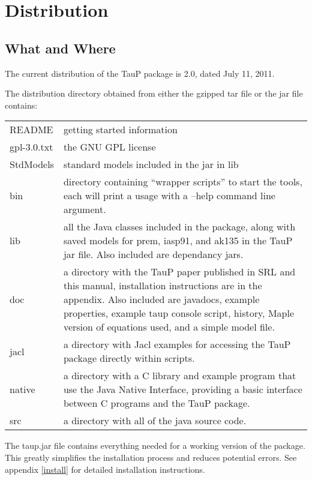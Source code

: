 
\section{Distribution}


\subsection{What and Where}
The current distribution of the TauP package is 2.0, dated July 11, 2011.

The distribution directory obtained from either the gzipped tar file or the jar file contains:

\begin{center}
\begin{tabular}{lp{4in}}
README & getting started information \\
gpl-3.0.txt & the GNU GPL license \\
StdModels & standard models included in the jar in lib \\
bin & directory containing ``wrapper scripts'' to start the tools,
   each will print a usage with a --help command line argument. \\
lib & all the Java classes included in the package, along with
               saved models for prem, iasp91, and ak135 in the TauP jar file. 
               Also included are dependancy jars. \\
doc & a directory with the TauP paper published in SRL and this manual,  
installation instructions are in the appendix. Also included are javadocs,
example properties, example taup console script, history, Maple version of equations used, and a simple model file.\\
jacl & a directory with Jacl examples for accessing the TauP package directly within scripts. \\
native & a directory with a C library and example program that use the
Java Native Interface, providing a basic interface between C programs
and the TauP package. \\
src & a directory with all of the java source code. \\
\end{tabular}
\end{center}

The taup.jar file contains everything needed for a working version of the package.
This greatly simplifies the installation process and reduces potential errors.
See appendix \ref{install} for detailed installation instructions.

